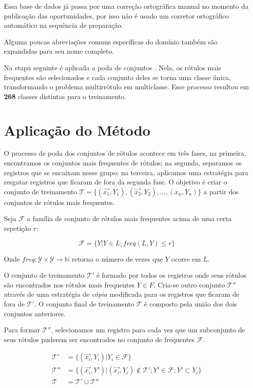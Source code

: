 \documentclass[runningheads,a4paper]{llncs}
\begin{document}
Essa base de dados já passa por uma correção ortográfica manual no momento da publicação das oportunidades, por isso não é usado um corretor ortográfico automático na sequência de preparação.

Alguma poucas abreviações comuns específicas do domínio também são expandidas para seu nome completo.

Na etapa seguinte é aplicada a poda de conjuntos \cite{Read2008-bt}. Nela, os rótulos mais frequentes são selecionados e cada conjunto deles se torna uma classe única, transformando o problema multirrótulo em multiclasse. Esse processo resultou em \textbf{268} classes distintas para o treinamento.

\section{Aplicação do Método} \label{sec:aplicacao}

O processo de poda dos conjuntos de rótulos acontece em três fases, na primeira, encontramos os conjuntos mais frequentes de rótulos; na segunda, separamos os registros que se encaixam nesse grupo; na terceira, aplicamos uma estratégia para resgatar registros que ficaram de fora da segunda fase. O objetivo é criar o conjunto de treinamento $\mathcal{T} = \{(\vec{x_1},Y_1), (\vec{x_2}, Y_2), \dots, (x_n, Y_n)\}$ a partir dos conjuntos de rótulos mais frequentes.

Seja $\mathcal{F}$ a família de conjunto de rótulos mais frequentes acima de uma certa repetição $r$:

$$
\mathcal{F} = \{Y | Y \in L; freq(L, Y) \leq r\}
$$

Onde $freq : \mathcal{Y} \times \mathcal{Y} \to \mathbb{N}$ retorna o número de vezes que $Y$ ocorre em $L$.

O conjunto de treinamento $\mathcal{T'}$ é formado por todos os registros onde seus rótulos são encontrados nos rótulos mais frequentes $Y \in F$. Cria-se outro conjunto $\mathcal{T''}$ através de uma estratégia de \textit{cópia} modificada para os registros que ficaram de fora de $\mathcal{T'}$. O conjunto final de treinamento $\mathcal{T}$ é composto pela união dos dois conjuntos anteriores.

Para formar $\mathcal{T''}$, selecionamos um registro para cada vez que um subconjunto de seus rótulos puderem ser encontrados no conjunto de frequentes $\mathcal{F}$.

\begin{align*}
\mathcal{T'} &= \{(\vec{x_i}, Y_i) | Y_i \in \mathcal{F}\} \\
\mathcal{T''} &=  \{(\vec{x_i}, Y') | (\vec{x_i}, Y_i) \notin \mathcal{T'}; Y' \in \mathcal{F}; Y' \subset Y_i \} \\
\mathcal{T} &=  \mathcal{T'} \cup \mathcal{T''}
\end{align*}
\end{document}
